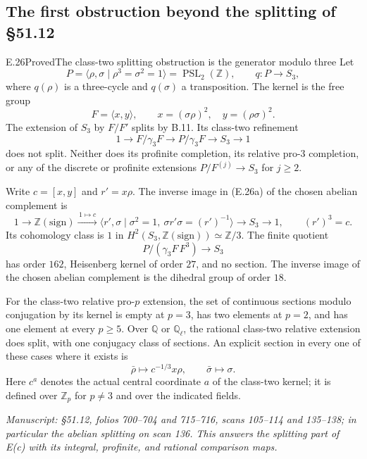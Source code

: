 \subsection{The first obstruction beyond the splitting of \S51.12}

\begin{statement}{E.26}{Proved}{The class-two splitting obstruction is the generator modulo three}
Let
\[
 P=\langle\rho,\sigma\mid\rho^3=\sigma^2=1\rangle
   =\operatorname{PSL}_2(\mathbb Z),\qquad
 q:P\longrightarrow S_3,
\]
where $q(\rho)$ is a three-cycle and $q(\sigma)$ a transposition.
The kernel is the free group
\[
 F=\langle x,y\rangle,\qquad
 x=(\sigma\rho)^2,\quad y=(\rho\sigma)^2.
\]
The extension of $S_3$ by $F/F'$ splits by B.11. Its class-two
refinement
\[
 1\longrightarrow F/\gamma_3F\longrightarrow P/\gamma_3F
       \longrightarrow S_3\longrightarrow1                         \tag{E.26a}
\]
does not split. Neither does its profinite completion, its relative
pro-$3$ completion, or any of the discrete or profinite extensions
$P/F^{(j)}\to S_3$ for $j\ge2$.

Write $c=[x,y]$ and $r'=x\rho$. The inverse image in (E.26a) of
the chosen abelian complement is
\[
 1\longrightarrow\mathbb Z(\mathrm{sign})
   \xrightarrow{\,1\mapsto c\,}
   \langle r',\sigma\mid\sigma^2=1,\ \sigma r'\sigma=(r')^{-1}\rangle
   \longrightarrow S_3\longrightarrow1,
 \qquad (r')^3=c.                                             \tag{E.26b}
\]
Its cohomology class is $1$ in
$H^2(S_3,\mathbb Z(\mathrm{sign}))\simeq\mathbb Z/3$.
The finite quotient
\[
 P/(\gamma_3F\,F^3)\longrightarrow S_3                          \tag{E.26c}
\]
has order $162$, Heisenberg kernel of order $27$, and no section.
The inverse image of the chosen abelian complement is the dihedral
group of order $18$.

For the class-two relative pro-$p$ extension, the set of continuous
sections modulo conjugation by its kernel is empty at $p=3$, has
two elements at $p=2$, and has one element at every $p\ge5$.
Over $\mathbb Q$ or $\mathbb Q_\ell$, the rational class-two
relative extension does split, with one conjugacy class of sections.
An explicit section in every one of these cases where it exists is
\[
 \bar\rho\longmapsto c^{-1/3}x\rho,
 \qquad \bar\sigma\longmapsto\sigma.                          \tag{E.26d}
\]
Here $c^a$ denotes the actual central coordinate $a$ of the
class-two kernel; it is defined over $\mathbb Z_p$ for $p\ne3$
and over the indicated fields.

\emph{Manuscript: \S51.12, folios 700--704 and 715--716,
scans 105--114 and 135--138; in particular the abelian splitting
on scan 136. This answers the splitting part of E(c) with its
integral, profinite, and rational comparison maps.}
\end{statement}

